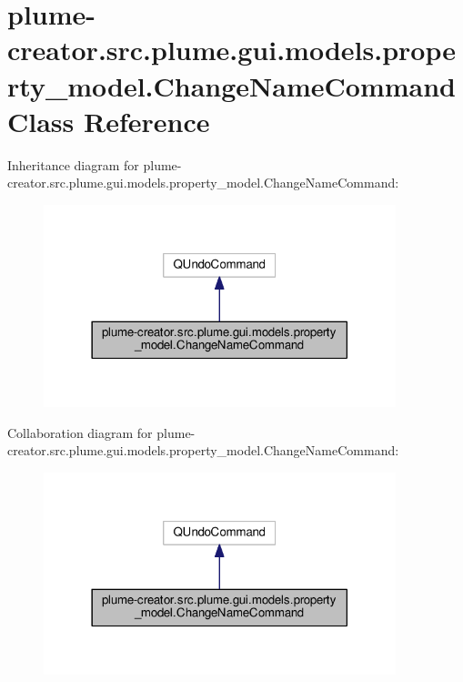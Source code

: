 \hypertarget{classplume-creator_1_1src_1_1plume_1_1gui_1_1models_1_1property__model_1_1_change_name_command}{}\section{plume-\/creator.src.\+plume.\+gui.\+models.\+property\+\_\+model.\+Change\+Name\+Command Class Reference}
\label{classplume-creator_1_1src_1_1plume_1_1gui_1_1models_1_1property__model_1_1_change_name_command}


Inheritance diagram for plume-\/creator.src.\+plume.\+gui.\+models.\+property\+\_\+model.\+Change\+Name\+Command\+:\nopagebreak
\begin{figure}[H]
\begin{center}
\leavevmode
\includegraphics[width=290pt]{classplume-creator_1_1src_1_1plume_1_1gui_1_1models_1_1property__model_1_1_change_name_command__inherit__graph}
\end{center}
\end{figure}


Collaboration diagram for plume-\/creator.src.\+plume.\+gui.\+models.\+property\+\_\+model.\+Change\+Name\+Command\+:\nopagebreak
\begin{figure}[H]
\begin{center}
\leavevmode
\includegraphics[width=290pt]{classplume-creator_1_1src_1_1plume_1_1gui_1_1models_1_1property__model_1_1_change_name_command__coll__graph}
\end{center}
\end{figure}
